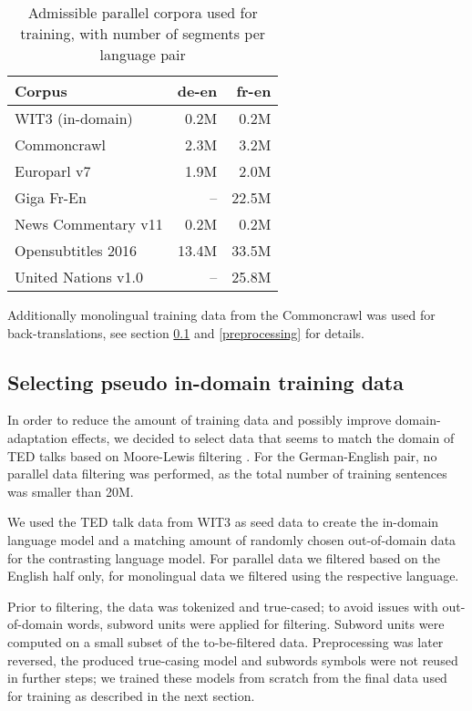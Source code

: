 \documentclass[11pt]{article}
\begin{document}
\begin{table}[h]\centering
 \begin{tabular}{lrr} \toprule
Corpus & de-en & fr-en \\ \midrule
WIT3 (in-domain) \cite{cettoloEtAl:EAMT2012} & 0.2M & 0.2M \\ \midrule 
Commoncrawl \cite{bojar-EtAl:2015:WMT} & 2.3M & 3.2M\\
Europarl v7 \cite{koehn2005epc} & 1.9M & 2.0M \\
Giga Fr-En \cite{bojar-EtAl:2015:WMT} & -- & 22.5M \\
News Commentary v11 \cite{bojar-EtAl:2015:WMT} & 0.2M & 0.2M \\
Opensubtitles 2016 \cite{LISON16.947} & 13.4M & 33.5M\\ 
United Nations v1.0 \cite{ZIEMSKI16.1195} & -- & 25.8M \\\bottomrule
 \end{tabular}
 \caption{Admissible parallel corpora used for training, with number of segments per language pair}\label{corpora1}
\end{table}

Additionally monolingual training data from the Commoncrawl \cite{Buck-commoncrawl} was used for back-translations, see section \ref{pseudo} and \ref{preprocessing} for details.

\subsection{Selecting pseudo in-domain training data}
\label{pseudo}

In order to reduce the amount of training data and possibly improve domain-adaptation effects, we decided to select data that seems to match the domain of TED talks based on Moore-Lewis filtering \cite{Moore:2010:ISL:1858842.1858883}. For the German-English pair, no parallel data filtering was performed, as the total number of training sentences was smaller than 20M. 

We used the TED talk data from WIT3 as seed data to create the in-domain language model and a matching amount of randomly chosen out-of-domain data for the contrasting language model. For parallel data we filtered based on the English half only, for monolingual data we filtered using the respective language. 

Prior to filtering, the data was tokenized and true-cased; to avoid issues with out-of-domain words, subword units \cite{DBLP:journals/corr/SennrichHB15} were applied for filtering. Subword units were computed on a small subset of the to-be-filtered data. Preprocessing was later reversed, the produced true-casing model and subwords symbols were not reused in further steps; we trained these models from scratch from the final data used for training as described in the next section. 
\end{document}
